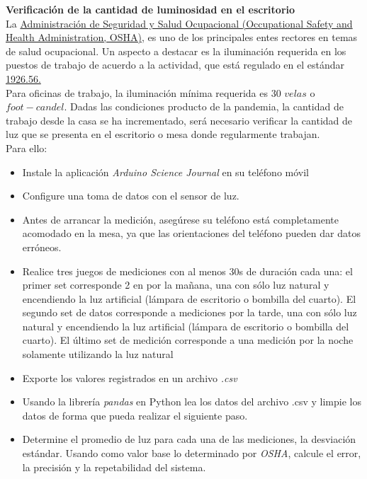 \documentclass[12pt]{article}
\begin{document}
\setlength{\parindent}{0em}

\noindent\textbf{Verificación de la cantidad de luminosidad en el escritorio}\\

La 
\href{https://www.osha.gov/}{Administración de Seguridad y Salud Ocupacional (Occupational Safety and Health Administration, OSHA)}, es uno de los principales entes rectores en temas de salud ocupacional. Un aspecto a destacar es la iluminación requerida en los puestos de trabajo de acuerdo a la actividad, que está regulado en el estándar \href{https://www.osha.gov/laws-regs/regulations/standardnumber/1926/1926.56}{1926.56.}\\

Para oficinas de trabajo, la iluminación mínima requerida es 30 $velas$ o $foot-candel$. Dadas las condiciones producto de la pandemia, la cantidad de trabajo desde la casa se ha incrementado, será necesario verificar la cantidad de luz que se presenta en el escritorio o mesa donde regularmente trabajan. 
\\

Para ello:

\begin{itemize}
    \item Instale la aplicación \textit{Arduino Science Journal} en su teléfono móvil
    \item Configure una toma de datos con el sensor de luz.
    \item Antes de arrancar la medición, asegúrese su teléfono está completamente acomodado en la mesa, ya que las orientaciones del teléfono pueden dar datos erróneos.
    \item Realice tres juegos de mediciones con al menos 30s de duración cada una: el primer set corresponde  2 en por la mañana, una con sólo luz natural y encendiendo la luz artificial (lámpara de escritorio o bombilla del cuarto). El segundo set de datos corresponde a mediciones por la tarde, una con sólo luz natural y encendiendo la luz artificial (lámpara de escritorio o bombilla del cuarto). El último set de medición corresponde a una medición por la noche solamente utilizando la luz natural
    \item Exporte los valores registrados en un archivo \emph{.csv}
    \item Usando la librería \emph{pandas} en Python lea los datos del archivo .csv y limpie los datos de forma que pueda realizar el siguiente paso.   
    \item Determine el promedio de luz para cada una de las mediciones, la desviación estándar. Usando como valor base lo determinado por \textit{OSHA}, calcule el error, la precisión y la repetabilidad del sistema.
\end{itemize}
\end{document}
